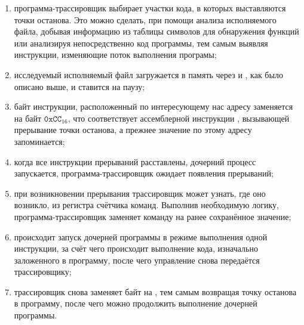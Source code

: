 \begin{enumerate}
	\item программа-трассировщик выбирает участки кода, в которых выставляются точки останова. Это можно сделать, при помощи анализа исполняемого файла, добывая информацию из таблицы символов для обнаружения функций или анализируя непосредственно код программы, тем самым выявляя инструкции, изменяющие поток выполнения програмы;
	
	\item исследуемый исполняемый файл загружается в память через  и , как было описано выше, и ставится на паузу;
	
	\item байт инструкции, расположенный по интересующему нас адресу заменяется на байт $\mathtt{0xCC}_{16}$, что соответствует ассемблерной инструкции , вызывающей прерывание точки останова, а прежнее значение по этому адресу запоминается;
	
	\item когда все инструкции прерываний расставлены, дочерний процесс запускается, программа-трассировщик ожидает появления прерываний;
	
	\item при возникновении прерывания трассировщик может узнать, где оно возникло, из регистра счётчика команд. Выполнив необходимую логику, программа-трассировщик заменяет команду на ранее сохранённое значение;
	
	\item происходит запуск дочерней программы в режиме выполнения одной инструкции, за счёт чего происходит выполнение кода, изначально заложенного в программу, после чего управление снова передаётся трассировщику;
	
	\item трассировщик снова заменяет байт на , тем самым возвращая точку останова в программу, после чего можно продолжить выполнение дочерней программы.
\end{enumerate}
